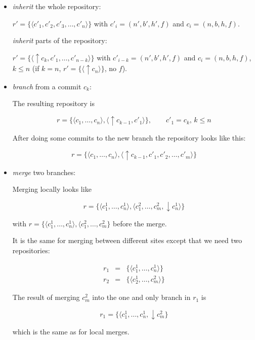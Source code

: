 \documentclass[fleqn, german, 10pt, a4paper]{article}
\begin{document}
\begin{itemize}
\item \emph{inherit} the whole repository:

$r' = \{\langle c'_1, c'_2, c'_3, \ldots, c'_n\rangle\}$ with
$c'_i = (n', b', h', f)$ and $c_i=(n, b, h, f)$.

\emph{inherit} parts of the repository:

$r'=\{\langle \uparrow c_k, c'_1, \ldots, c'_{n-k}\rangle \}$ with
$c'_{i-k}=(n', b', h', f)$ and $c_i=(n, b, h, f)$, $k\le n$ (if $k=n$,
$r'=\{\langle \uparrow c_n\rangle\}$, no $f$).

\item \emph{branch} from a commit $c_k$:

The resulting repository is

\begin{displaymath}
r = \{\langle c_1, \ldots, c_n\rangle, \langle \uparrow c_{k-1}, c'_1
\rangle\}, \qquad c'_1=c_k, \, k\le n
\end{displaymath}

After doing some commits to the new branch the repository looks like
this:

\begin{displaymath}
r = \{\langle c_1, \ldots, c_n\rangle, \langle \uparrow c_{k-1}, c'_1, c'_2, \ldots, c'_m
\rangle\}
\end{displaymath}

\item \emph{merge} two branches:

Merging locally looks like

\begin{displaymath}
r = \{\langle c_1^1, \ldots, c_n^1\rangle, \langle c_1^2, \ldots,
c_m^2, \downarrow c_n^1\rangle\}
\end{displaymath}

with $r=\{\langle c_1^1, \ldots, c_n^1\rangle, \langle c_1^2, \ldots,
c_m^2\}$ before the merge.

It is the same for merging between different sites except that we need two
repositories:

\begin{eqnarray*}
r_1 &=& \{\langle c_1^1, \ldots, c_n^1\rangle\} \\
r_2 &=& \{\langle c_2^1, \ldots, c_m^2\rangle\}
\end{eqnarray*}

The result of merging $c_m^2$ into the one and only branch in $r_1$ is

\begin{displaymath}
r_1 = \{\langle c_1^1, \ldots, c_n^1, \downarrow c_m^2\}
\end{displaymath}

which is the same as for local merges.
\end{itemize}
\end{document}
